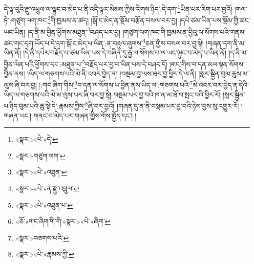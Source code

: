 དེ་ལྟ་བུའི་རྫུ་འཕྲུལ་ལ་ལྟུང་བ་མེད་པ་ནི་འདི་ལྟར་སེམས་ཀྱིས་རིགས་ཉིད་:དེ་དག་\footnote{«སྣར་»«པེ་»དེ་}ཡིན་པར་རིག་པར་བྱའོ། །གལ་ཏེ་:གཙུག་ལག་ཁང་\footnote{«སྣར་»གཙུག་ལག་}གི་ཁྱམས་ན་ཚད། །སྒོ་ང་མེད་ན་སྡོམ་བརྩོན་བསལ་བར་བྱ། །དཔེ་ཙམ་ཡིན་པས་སྡོམ་གྱི་ཚང་ཡང་ཡིན། །ད་ནི་མ་བྱིན་ཕྱོགས་མཐུན་\footnote{«སྣར་»«པེ་»འཐུན་}བཤད་པར་བྱ། །གཙུག་ལག་ཁང་གི་ཁྱམས་ན་བྱིའུ་ལ་སོགས་པའི་གནས་ཚང་གང་དག་ཡོད་པ་དེ་དག་སྒོ་ང་མེད་པ་ཡིན་:ན་བརྟུལ་ཞུགས་\footnote{«སྣར་»«པེ་»ན་རྫུ་འཕྲུལ་}ཅན་གྱིས་བསལ་བར་བྱ་སྟེ། །གཞན་དག་ནི་མ་ཡིན་ནོ། །དེ་ནི་དཔེར་བརྗོད་པ་ཙམ་ཡིན་པས་དེ་བཞིན་དུ་རྒྱ་ལ་སོགས་པ་ལ་ཡང་ལྟུང་བ་མེད་པ་ཡིན་ནོ། །ད་ནི་མ་བྱིན་ལེན་པའི་ཕྱོགས་དང་:མཐུན་པ་\footnote{«སྣར་»«པེ་»འཐུན་པ་}བརྗོད་པར་བྱ་བ་ཡིན་པས་དེ་བཤད་དོ། །གང་གིས་བ་དན་མལ་སྟན་སོགས་བྱིན་ནས། །ཡིད་ལ་གཅགས་པའི་མེ་ནི་འབར་བྱེད་ན། །བསྡམ་བྱ་ལས་ཐར་བྱ་ཕྱིར་དེ་ལ་ནི། །སླར་སྦྱིན་བུམ་ཆུས་མ་ལུས་ཞི་བར་བྱ། །:གང་ཞིག་གིས་\footnote{«ཅོ་»གང་ཞིག་ིག་གི་«སྣར་»«པེ་»ཞིག་}བ་དན་ལ་སོགས་པ་བྱིན་ནས་ཡིད་ལ་:གཅགས་པའི་\footnote{«སྣར་»བཅགས་པའི་}མེ་འབར་བར་བྱེད་ན་དེའི་ཡིད་ལ་གཅགས་པའི་མེ་མ་ལུས་པར་ཞི་བར་བྱ་སྟེ། བསྡམ་པར་བྱ་བའི་ཁ་ན་མ་ཐོ་བ་སྤང་བའི་ཕྱིར་རོ། །སླར་སྦྱིན་པ་ཉིད་བུམ་པའི་ཆུ་སྟེ་དེ་:རྣམས་ཀྱིས་\footnote{«སྣར་»«པེ་»རྣམས་ཀྱི་}ཞི་བར་བྱའོ། །གཞན་དུ་ན་ནི་བསྡམ་པར་བྱ་བའི་ཉེས་བྱས་སུ་འགྱུར་རོ། །གཞན་ཡང་། གནང་བ་མེད་པར་གཞན་གྱིས་གོས་སྤྱོད་དང་། །
